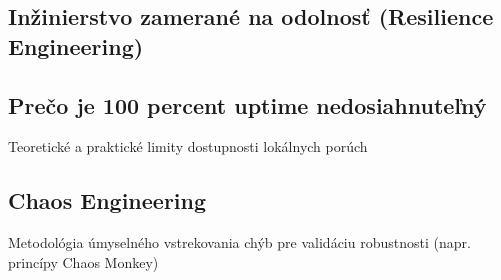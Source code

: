 \documentclass[../../../thesis.tex]{subfiles}
\begin{document}
    \subsection{Inžinierstvo zamerané na odolnosť (Resilience Engineering)}

    \subsection*{Prečo je 100 percent uptime nedosiahnuteľný}
    Teoretické a praktické limity dostupnosti lokálnych porúch

    \subsection*{Chaos Engineering}
    Metodológia úmyselného vstrekovania chýb pre validáciu robustnosti (napr. princípy Chaos Monkey)
\end{document}
